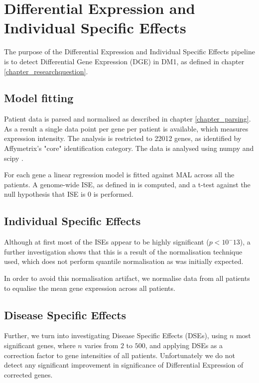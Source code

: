 \section{Differential Expression and Individual Specific Effects} \label {chapter_DE}

The purpose of the Differential Expression and Individual Specific Effects pipeline is to detect Differential Gene Expression (DGE) in DM1, as defined in chapter \ref{chapter_researchquestion}.

\subsection{Model fitting} \label{section_modelfitting}

Patient data is parsed and normalised as described in chapter \ref{chapter_parsing}. As a result a single data point per gene per patient is available, which measures expression intensity. The analysis is restricted to 22012 genes, as identified by Affymetrix's "core" identification category. The data is analysed using numpy and scipy \parencite{Scipy2017}. 

For each gene a linear regression model is fitted against MAL across all the patients. A genome-wide ISE, as defined in \cite{Kurkiewicz2017} is computed, and a t-test against the null hypothesis that ISE is 0 is performed.

\subsection{Individual Specific Effects}

Although at first most of the ISEs appear to be highly significant ($p < 10^-13$), a further investigation shows that this is a result of the normalisation technique used, which does not perform quantile normalisation as was initially expected.

In order to avoid this normalisation artifact, we normalise data from all patients to equalise the mean gene expression across all patients.

\subsection{Disease Specific Effects}

Further, we turn into investigating Disease Specific Effects (DSEs), using $n$ most significant genes, where $n$ varies from $2$ to $500$, and applying DSEs as a correction factor to gene intensities of all patients. Unfortunately we do not detect any significant improvement in significance of Differential Expression of corrected genes.

